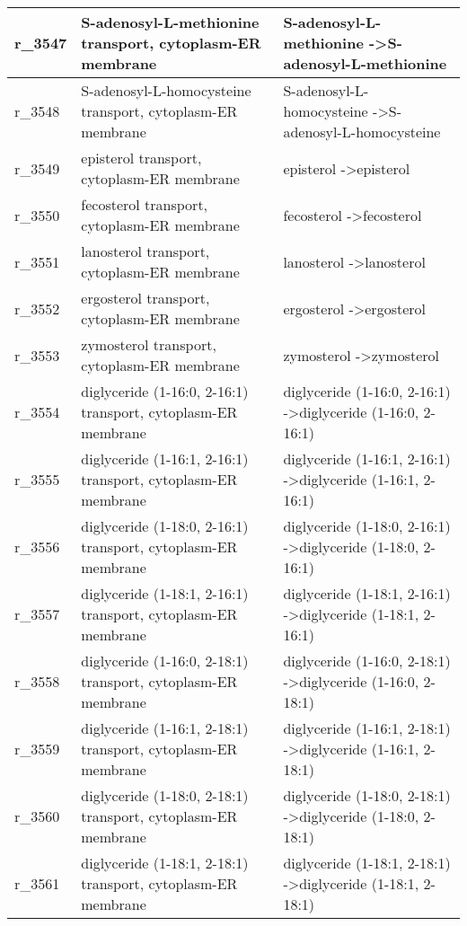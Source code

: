 \begin{landscape}
{\begin{longtable}{|l|p{7cm}|p{15cm}|}
r\_3547 & S-adenosyl-L-methionine transport, cytoplasm-ER membrane & S-adenosyl-L-methionine  -\textgreater S-adenosyl-L-methionine \\ \hline
r\_3548 & S-adenosyl-L-homocysteine transport, cytoplasm-ER membrane & S-adenosyl-L-homocysteine  -\textgreater S-adenosyl-L-homocysteine \\ \hline
r\_3549 & episterol transport, cytoplasm-ER membrane & episterol  -\textgreater episterol \\ \hline
r\_3550 & fecosterol transport, cytoplasm-ER membrane & fecosterol  -\textgreater fecosterol \\ \hline
r\_3551 & lanosterol transport, cytoplasm-ER membrane & lanosterol  -\textgreater lanosterol \\ \hline
r\_3552 & ergosterol transport, cytoplasm-ER membrane & ergosterol  -\textgreater ergosterol \\ \hline
r\_3553 & zymosterol transport, cytoplasm-ER membrane & zymosterol  -\textgreater zymosterol \\ \hline
r\_3554 & diglyceride (1-16:0, 2-16:1) transport, cytoplasm-ER membrane & diglyceride (1-16:0, 2-16:1)  -\textgreater diglyceride (1-16:0, 2-16:1) \\ \hline
r\_3555 & diglyceride (1-16:1, 2-16:1) transport, cytoplasm-ER membrane & diglyceride (1-16:1, 2-16:1)  -\textgreater diglyceride (1-16:1, 2-16:1) \\ \hline
r\_3556 & diglyceride (1-18:0, 2-16:1) transport, cytoplasm-ER membrane & diglyceride (1-18:0, 2-16:1)  -\textgreater diglyceride (1-18:0, 2-16:1) \\ \hline
r\_3557 & diglyceride (1-18:1, 2-16:1) transport, cytoplasm-ER membrane & diglyceride (1-18:1, 2-16:1)  -\textgreater diglyceride (1-18:1, 2-16:1) \\ \hline
r\_3558 & diglyceride (1-16:0, 2-18:1) transport, cytoplasm-ER membrane & diglyceride (1-16:0, 2-18:1)  -\textgreater diglyceride (1-16:0, 2-18:1) \\ \hline
r\_3559 & diglyceride (1-16:1, 2-18:1) transport, cytoplasm-ER membrane & diglyceride (1-16:1, 2-18:1)  -\textgreater diglyceride (1-16:1, 2-18:1) \\ \hline
r\_3560 & diglyceride (1-18:0, 2-18:1) transport, cytoplasm-ER membrane & diglyceride (1-18:0, 2-18:1)  -\textgreater diglyceride (1-18:0, 2-18:1) \\ \hline
r\_3561 & diglyceride (1-18:1, 2-18:1) transport, cytoplasm-ER membrane & diglyceride (1-18:1, 2-18:1)  -\textgreater diglyceride (1-18:1, 2-18:1) \\ \hline

\end{longtable}}
\end{landscape}
